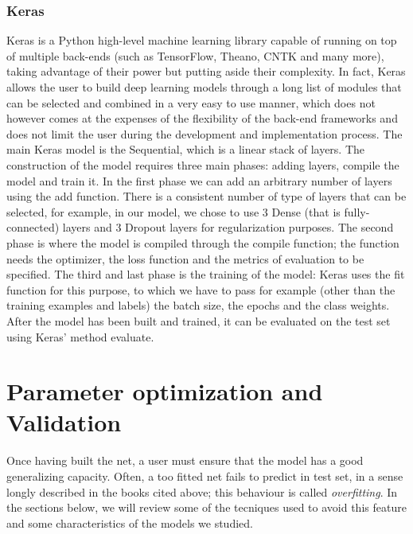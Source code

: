 \documentclass{article}
\begin{document}
\subsubsection{Keras}
Keras is a Python high-level machine learning library capable of running on top of multiple back-ends (such as TensorFlow, Theano, CNTK and many more), taking advantage of their power but putting aside their complexity. In fact, Keras allows the user to build deep learning models through a long list of modules that can be selected and combined in a very easy to use manner, which does not however comes at the expenses of the flexibility of the back-end frameworks and does not limit the user during the development and implementation process. 
The main Keras model is the Sequential, which is a linear stack of layers. The construction of the model requires three main phases: adding layers, compile the model and train it. 
In the first phase we can add an arbitrary number of layers using the add function. There is a consistent number of type of layers that can be selected, for example, in our model, we chose to use 3 Dense (that is fully-connected) layers and 3 Dropout layers for regularization purposes. 
The second phase is where the model is compiled through the compile function; the function needs the optimizer, the loss function and the metrics of evaluation to be specified. 
The third and last phase is the training of the model: Keras uses the fit function for this purpose, to which we have to pass for example (other than the training examples and labels) the batch size, the epochs and the class weights. 
After the model has been built and trained, it can be evaluated on the test set using Keras’ method evaluate.



\section{Parameter optimization and Validation}

Once having built the net, a user must ensure that the model has a good generalizing capacity. Often, a too fitted net fails to predict in test set, in a sense longly described in the books cited above; this behaviour is called \textit{overfitting}.
In the sections below, we will review some of the tecniques used to avoid this feature and some characteristics of the models we studied.
\end{document}
